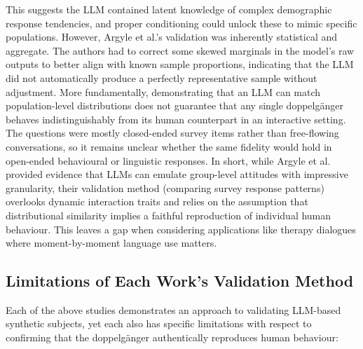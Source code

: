 This suggests the LLM contained latent knowledge of complex demographic response
tendencies, and proper conditioning could unlock these to mimic specific populations.
However, Argyle et al.’s validation was inherently statistical and aggregate. The
authors had to correct some skewed marginals in the model’s raw outputs to better align
with known sample proportions, indicating that the LLM did not automatically produce a
perfectly representative sample without adjustment. More fundamentally, demonstrating
that an LLM can match population-level distributions does not guarantee that any single
doppelgänger behaves indistinguishably from its human counterpart in an interactive
setting. The questions were mostly closed-ended survey items rather than free-flowing
conversations, so it remains unclear whether the same fidelity would hold in open-ended
behavioural or linguistic responses. In short, while Argyle et al. provided evidence
that LLMs can emulate group-level attitudes with impressive granularity, their
validation method (comparing survey response patterns) overlooks dynamic interaction
traits and relies on the assumption that distributional similarity implies a faithful
reproduction of individual human behaviour. This leaves a gap when considering
applications like therapy dialogues where moment-by-moment language use matters.

\subsection{Limitations of Each Work's Validation Method}

Each of the above studies demonstrates an approach to validating LLM-based synthetic
subjects, yet each also has specific limitations with respect to confirming that the
doppelgänger authentically reproduces human behaviour:


